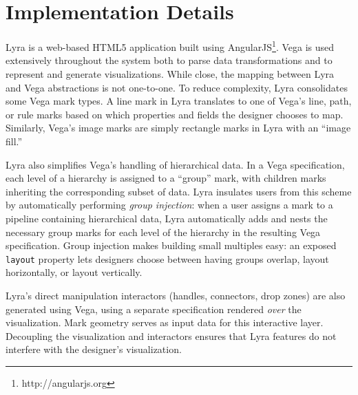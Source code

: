 \vspace{-10pt}

\section{Implementation Details}

\vspace{-10pt}

Lyra is a web-based HTML5 application built using
AngularJS\footnote{http://angularjs.org}. Vega is used extensively throughout
the system both to parse data transformations and to represent and generate
visualizations. While close, the mapping between Lyra and Vega abstractions is
not one-to-one. To reduce complexity, Lyra consolidates some Vega mark types. A
line mark in Lyra translates to one of Vega's line, path, or rule marks based on
which properties and fields the designer chooses to map. Similarly, Vega's image
marks are simply rectangle marks in Lyra with an ``image fill.''

Lyra also simplifies Vega's handling of hierarchical data. In a Vega
specification, each level of a hierarchy is assigned to a ``group'' mark, with
children marks inheriting the corresponding subset of data. Lyra insulates users
from this scheme by automatically performing \emph{group injection}: when a user
assigns a mark to a pipeline containing hierarchical data, Lyra automatically
adds and nests the necessary group marks for each level of the hierarchy in the
resulting Vega specification. Group injection makes building small multiples
easy: an exposed \texttt{layout} property lets designers choose between having
groups overlap, layout horizontally, or layout vertically.

Lyra's direct manipulation interactors (handles, connectors, drop zones) are
also generated using Vega, using a separate specification rendered \emph{over}
the visualization. Mark geometry serves as input data for this interactive
layer. Decoupling the visualization and interactors ensures that Lyra features
do not interfere with the designer's visualization.